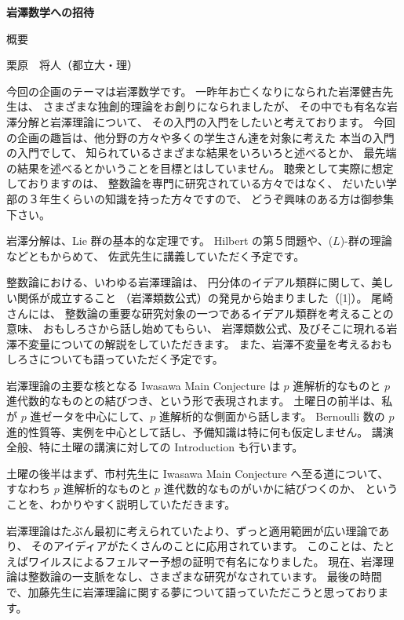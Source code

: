 \documentclass[uplatex,dvipdfmx]{jlreq}
\begin{document}
\begin{center}
  {\Large\bfseries 岩澤数学への招待}

  \vspace{1pc}
  {\large 概要}
\end{center}
\begin{flushright}
  栗原　将人（都立大・理）
\end{flushright}

今回の企画のテーマは岩澤数学です。
一昨年お亡くなりになられた岩澤健吉先生は、
さまざまな独創的理論をお創りになられましたが、
その中でも有名な岩澤分解と岩澤理論について、
その入門の入門をしたいと考えております。
今回の企画の趣旨は、他分野の方々や多くの学生さん達を対象に考えた
本当の入門の入門でして、
知られているさまざまな結果をいろいろと述べるとか、
最先端の結果を述べるとかいうことを目標とはしていません。
聴衆として実際に想定しておりますのは、
整数論を専門に研究されている方々ではなく、
だいたい学部の３年生くらいの知識を持った方々ですので、
どうぞ興味のある方は御参集下さい。

岩澤分解は、Lie 群の基本的な定理です。
Hilbert の第５問題や、($L$)-群の理論などともからめて、
佐武先生に講義していただく予定です。

整数論における、いわゆる岩澤理論は、
円分体のイデアル類群に関して、美しい関係が成立すること
（岩澤類数公式）の発見から始まりました（[1]）。
尾崎さんには、
整数論の重要な研究対象の一つであるイデアル類群を考えることの意味、
おもしろさから話し始めてもらい、
岩澤類数公式、及びそこに現れる岩澤不変量についての解説をしていただきます。
また、岩澤不変量を考えるおもしろさについても語っていただく予定です。

岩澤理論の主要な核となる Iwasawa Main Conjecture は
$p$ 進解析的なものと $p$ 進代数的なものとの結びつき、という形で表現されます。
土曜日の前半は、私が $p$ 進ゼータを中心にして、$p$ 進解析的な側面から話します。
Bernoulli 数の $p$ 進的性質等、実例を中心として話し、予備知識は特に何も仮定しません。
講演全般、特に土曜の講演に対しての Introduction も行います。

土曜の後半はまず、市村先生に Iwasawa Main Conjecture へ至る道について、
すなわち $p$ 進解析的なものと $p$ 進代数的なものがいかに結びつくのか、
ということを、わかりやすく説明していただきます。

岩澤理論はたぶん最初に考えられていたより、ずっと適用範囲が広い理論であり、
そのアイディアがたくさんのことに応用されています。
このことは、たとえばワイルスによるフェルマー予想の証明で有名になりました。
現在、岩澤理論は整数論の一支脈をなし、さまざまな研究がなされています。
最後の時間で、加藤先生に岩澤理論に関する夢について語っていただこうと思っております。
\end{document}
